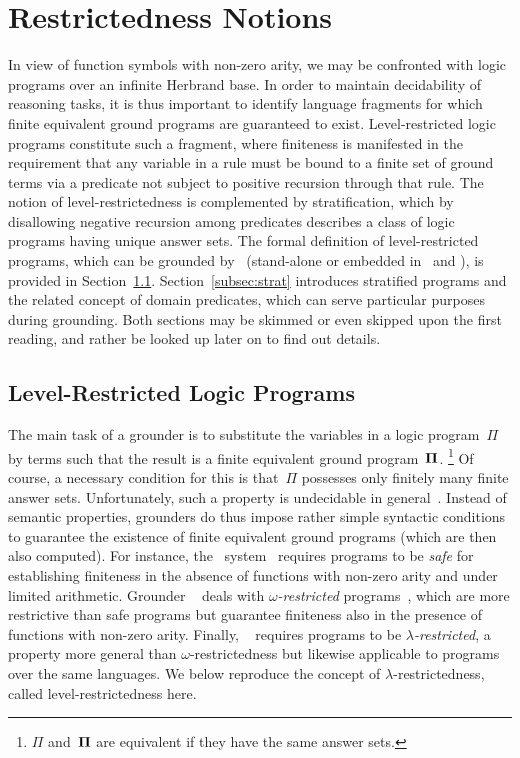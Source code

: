 \section{Restrictedness Notions}\label{sec:restricted}

In view of function symbols with non-zero arity,
we may be confronted with logic programs over an infinite Herbrand base.
In order to maintain decidability of reasoning tasks,
it is thus important to identify language fragments for which
finite equivalent ground programs are guaranteed to exist.
Level-restricted logic programs constitute such a fragment,
where finiteness is manifested in the requirement that any variable in a rule
must be bound to a finite set of ground terms via a predicate not
subject to positive recursion through that rule.
The notion of level-restrictedness is complemented by stratification,
which by disallowing negative recursion among predicates describes a
class of logic programs having unique answer sets.
The formal definition of level-restricted programs,
which can be grounded by \gringo\ (stand-alone or embedded in \clingo\ and \iclingo),
is provided in Section~\ref{subsec:lambda}.
Section~\ref{subsec:strat} introduces stratified programs and the related
concept of domain predicates, which can serve particular purposes during grounding.
Both sections may be skimmed or even skipped upon the first reading,
and rather be looked up later on to find out details.


\subsection{Level-Restricted Logic Programs}\label{subsec:lambda}

The main task of a grounder is to substitute the variables in a logic program~$\Pi$
by terms such that the result is a finite equivalent ground program~$\mathbf{\Pi}$.%
\footnote{$\Pi$ and~$\mathbf{\Pi}$ are equivalent if they have the same answer sets.}
Of course, a necessary condition for this is that~$\Pi$ possesses
only finitely many finite answer sets.
Unfortunately, such a property is undecidable in general~\cite{daeigovo01a}.
Instead of semantic properties, grounders do thus impose rather simple syntactic
conditions to guarantee the existence of finite equivalent ground programs
(which are then also computed).
For instance, the \dlv\ system~\cite{dlv03a} requires programs to be \emph{safe} for
establishing finiteness in the absence of functions with non-zero arity and under
limited arithmetic.
Grounder \lparse~\cite{lparseManual} deals with \emph{$\omega$-restricted}
programs~\cite{syrjanen01a}, which are more restrictive than safe programs
but guarantee finiteness also in the presence of functions with non-zero arity.
Finally, \gringo~\cite{gescth07a} requires programs to be \emph{$\lambda$-restricted},
a property more general than $\omega$-restrictedness but likewise applicable
to programs over the same languages.
We below reproduce the concept of $\lambda$-restrictedness,
called level-restrictedness here.

